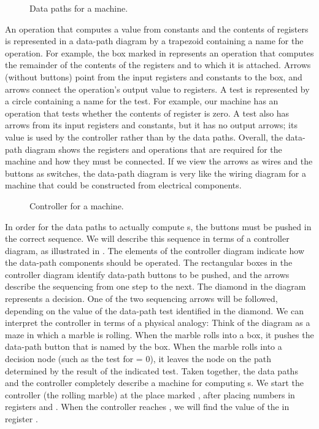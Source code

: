 \begin{figure}[tb]
	\centering
	
	\caption{
		Data paths for a  machine.
	}
	\label{Figure 5.1}
\end{figure}

An operation that computes a value from constants and the contents of registers is represented in a data-path diagram by a trapezoid containing a name for the operation.
For example, the box marked  in  represents an operation that computes the remainder of the contents of the registers  and  to which it is attached.
Arrows (without buttons) point from the input registers and constants to the box, and arrows connect the operation’s output value to registers.
A test is represented by a circle containing a name for the test.
For example, our  machine has an operation that tests whether the contents of register  is zero.
A test also has arrows from its input registers and constants, but it has no output arrows;
its value is used by the controller rather than by the data paths.
Overall, the data-path diagram shows the registers and operations that are required for the machine and how they must be connected.
If we view the arrows as wires and the  buttons as switches, the data-path diagram is very like the wiring diagram for a machine that could be constructed from electrical components.

\begin{figure}[tb]
	\centering
	
	\caption{
		Controller for a  machine.
	}
	\label{Figure 5.2}
\end{figure}

In order for the data paths to actually compute s, the buttons must be pushed in the correct sequence.
We will describe this sequence in terms of a controller diagram, as illustrated in .
The elements of the controller diagram indicate how the data-path components should be operated.
The rectangular boxes in the controller diagram identify data-path buttons to be pushed, and the arrows describe the sequencing from one step to the next.
The diamond in the diagram represents a decision.
One of the two sequencing arrows will be followed, depending on the value of the data-path test identified in the diamond.
We can interpret the controller in terms of a physical analogy:
Think of the diagram as a maze in which a marble is rolling.
When the marble rolls into a box, it pushes the data-path button that is named by the box.
When the marble rolls into a decision node (such as the test for  = 0), it leaves the node on the path determined by the result of the indicated test.
Taken together, the data paths and the controller completely describe a machine for computing s.
We start the controller (the rolling marble) at the place marked , after placing numbers in registers  and .
When the controller reaches , we will find the value of the  in register .



